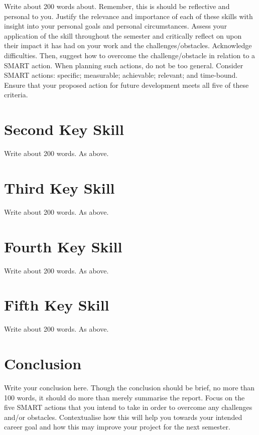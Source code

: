 \documentclass{scrartcl}
\begin{document}
Write about 200 words about. Remember, this is should be reflective and personal to you. Justify the relevance and importance of each of these skills with insight into your personal goals and personal circumstances. Assess your application of the skill throughout the semester and critically reflect on upon their impact it has had on your work and the challenges/obstacles. Acknowledge difficulties. Then, suggest how to overcome the challenge/obstacle in relation to a SMART action. When planning such actions, do not be too general. Consider SMART actions:
specific; measurable; achievable; relevant; and time-bound. Ensure that your proposed action for future development meets all five of these criteria.

\section{Second Key Skill}

Write about 200 words. As above.

\section{Third Key Skill}

Write about 200 words. As above.

\section{Fourth Key Skill}

Write about 200 words. As above.

\section{Fifth Key Skill}

Write about 200 words. As above.

\section{Conclusion}

Write your conclusion here. Though the conclusion should be brief, no more than 100 words, it should do more than merely summarise the report. Focus on the five SMART actions that you intend to take in order to overcome any challenges and/or obstacles. Contextualise how this will help you towards your intended career goal and how this may improve your project for the next semester.



\end{document}
